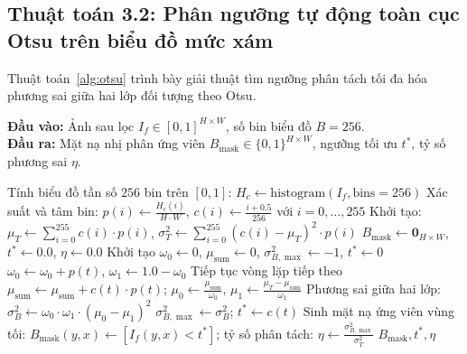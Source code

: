 \subsection{Thuật toán 3.2: Phân ngưỡng tự động toàn cục Otsu trên biểu đồ mức xám}

Thuật toán~\ref{alg:otsu} trình bày giải thuật tìm ngưỡng phân tách tối đa hóa phương sai giữa hai lớp đối tượng theo Otsu.

\begin{algorithm}[!htbp]
\small{}
\caption{Phân ngưỡng tự động toàn cục Otsu 256 bin}
\label{alg:otsu}
\textbf{Đầu vào:} Ảnh sau lọc $I_f \in [0, 1]^{H \times W}$, số bin biểu đồ $B = 256$. \\
\textbf{Đầu ra:} Mặt nạ nhị phân ứng viên $B_{\text{mask}} \in \{0, 1\}^{H \times W}$, ngưỡng tối ưu $t^*$, tỷ số phương sai $\eta$.
\begin{algorithmic}[1]
\STATE Tính biểu đồ tần số $256$ bin trên $[0, 1]$: $H_c \leftarrow \text{histogram}(I_f, \text{bins}=256)$
\STATE Xác suất và tâm bin: $p(i) \leftarrow \frac{H_c(i)}{H \cdot W}$, $c(i) \leftarrow \frac{i + 0.5}{256}$ với $i = 0, \dots, 255$
\STATE Khởi tạo: $\mu_T \leftarrow \sum_{i=0}^{255} c(i) \cdot p(i)$, $\sigma_T^2 \leftarrow \sum_{i=0}^{255} (c(i) - \mu_T)^2 \cdot p(i)$
    \RETURN $B_{\text{mask}} \leftarrow \mathbf{0}_{H \times W}$, $t^* \leftarrow 0.0$, $\eta \leftarrow 0.0$
\ENDIF
\STATE Khởi tạo $\omega_0 \leftarrow 0$, $\mu_{\text{sum}} \leftarrow 0$, $\sigma_{B,\max}^2 \leftarrow -1$, $t^* \leftarrow 0$
    \STATE $\omega_0 \leftarrow \omega_0 + p(t)$, $\omega_1 \leftarrow 1.0 - \omega_0$
        \STATE Tiếp tục vòng lặp tiếp theo
    \ENDIF
    \STATE $\mu_{\text{sum}} \leftarrow \mu_{\text{sum}} + c(t) \cdot p(t)$; $\mu_0 \leftarrow \frac{\mu_{\text{sum}}}{\omega_0}$, $\mu_1 \leftarrow \frac{\mu_T - \mu_{\text{sum}}}{\omega_1}$
    \STATE Phương sai giữa hai lớp: $\sigma_B^2 \leftarrow \omega_0 \cdot \omega_1 \cdot (\mu_0 - \mu_1)^2$
        \STATE $\sigma_{B,\max}^2 \leftarrow \sigma_B^2$; $t^* \leftarrow c(t)$
    \ENDIF
\ENDFOR
\STATE Sinh mặt nạ ứng viên vùng tối: $B_{\text{mask}}(y, x) \leftarrow [I_f(y, x) < t^*]$; tỷ số phân tách: $\eta \leftarrow \frac{\sigma_{B,\max}^2}{\sigma_T^2}$
\RETURN $B_{\text{mask}}, t^*, \eta$
\end{algorithmic}
\end{algorithm}
